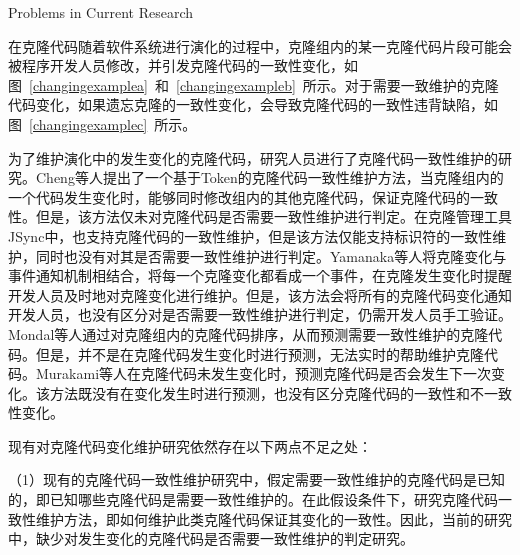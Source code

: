 {Problems in Current Research}

在克隆代码随着软件系统进行演化的过程中，克隆组内的某一克隆代码片段可能会被程序开发人员修改，并引发克隆代码的一致性变化\cite{saha2011automatic}，如图~\ref{changingexamplea}~和~\ref{changingexampleb}~所示。对于需要一致维护的克隆代码变化，如果遗忘克隆的一致性变化，会导致克隆代码的一致性违背缺陷\cite{aversano2007clones}\cite{bettenburg2009empirical}，如图~\ref{changingexamplec}~所示。%


为了维护演化中的发生变化的克隆代码，研究人员进行了克隆代码一致性维护的研究。Cheng等人\cite{cheng2016rule}提出了一个基于Token的克隆代码一致性维护方法，当克隆组内的一个代码发生变化时，能够同时修改组内的其他克隆代码，保证克隆代码的一致性。但是，该方法仅未对克隆代码是否需要一致性维护进行判定。在克隆管理工具JSync\cite{nguyen2012clone}中，也支持克隆代码的一致性维护，但是该方法仅能支持标识符的一致性维护，同时也没有对其是否需要一致性维护进行判定。Yamanaka等人\cite{yamanaka2013applying}将克隆变化与事件通知机制相结合，将每一个克隆变化都看成一个事件，在克隆发生变化时提醒开发人员及时地对克隆变化进行维护。但是，该方法会将所有的克隆代码变化通知开发人员，也没有区分对是否需要一致性维护进行判定，仍需开发人员手工验证。Mondal等人通过对克隆组内的克隆代码排序，从而预测需要一致性维护的克隆代码\cite{mondal2014prediction}。但是，并不是在克隆代码发生变化时进行预测，无法实时的帮助维护克隆代码。Murakami等人在克隆代码未发生变化时，预测克隆代码是否会发生下一次变化\cite{murakami2014predicting}。该方法既没有在变化发生时进行预测，也没有区分克隆代码的一致性和不一致性变化。

现有对克隆代码变化维护研究依然存在以下两点不足之处：

（1）现有的克隆代码一致性维护研究中，假定需要一致性维护的克隆代码是已知的，即已知哪些克隆代码是需要一致性维护的。在此假设条件下，研究克隆代码一致性维护方法，即如何维护此类克隆代码保证其变化的一致性。因此，当前的研究中，缺少对发生变化的克隆代码是否需要一致性维护的判定研究。

